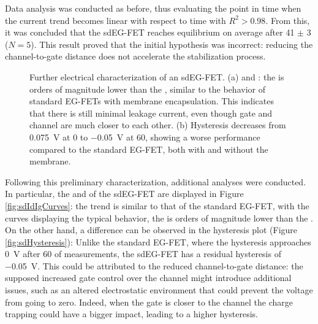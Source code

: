 Data analysis was conducted as before, thus evaluating the point in time when the current trend becomes linear with respect to time with $R^2>0.98$.
From this, it was concluded that the sdEG-FET reaches equilibrium on average after \SI{41}{} $\pm$ \SI{3}{\min} ($N = 5$). This result proved that the initial hypothesis was incorrect: reducing the channel-to-gate distance does not accelerate the stabilization process.

\begin{figure}
    \centering
    \hfill
    \caption{Further electrical characterization of an sdEG-FET.
    (a) \igs{} and \ids{}: the \igs{} is orders of magnitude lower than the \ids{}, similar to the behavior of standard EG-FETs with membrane encapsulation. This indicates that there is still minimal leakage current, even though gate and channel are much closer to each other. 
    (b) Hysteresis decreases from \SI{0.075}{\V} at \SI{0}{\min} to \SI{-0.05}{\V} at \SI{60}{\min}, showing a worse performance compared to the standard EG-FET, both with and without the membrane.}
    \label{fig:sdParameters}
\end{figure}

Following this preliminary characterization, additional analyses were conducted. In particular, the \ids{} and \igs{} of the sdEG-FET are displayed in Figure \ref{fig:sdIdIgCurves}: the trend is similar to that of the standard EG-FET, with the curves displaying the typical behavior, \ie{} the \igs{} is orders of magnitude lower than the \ids{}. On the other hand, a difference can be observed in the hysteresis plot (Figure \ref{fig:sdHysteresis}): Unlike the standard EG-FET, where the hysteresis approaches \SI{0}{\V} after \SI{60}{\min} of measurements, the sdEG-FET has a residual hysteresis of \SI{-0.05}{\V}.  This could be attributed to the reduced channel-to-gate distance: the supposed increased gate control over the channel might introduce additional issues, such as an altered electrostatic environment that could prevent the voltage from going to zero. Indeed, when the gate is closer to the channel the charge trapping could have a bigger impact, leading to a higher hysteresis.

